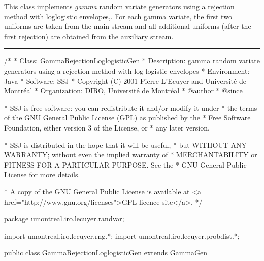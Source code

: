 
This class implements {\em gamma\/} random variate generators using
 a rejection method with loglogistic envelopes,.
For each gamma variate, the first two uniforms are taken from the 
main stream and all additional uniforms (after the first rejection)
are obtained from the auxiliary stream.

\bigskip\hrule

\begin{code}
\begin{hide}
/*
 * Class:        GammaRejectionLoglogisticGen
 * Description:  gamma random variate generators using a rejection method
                 with log-logistic envelopes
 * Environment:  Java
 * Software:     SSJ 
 * Copyright (C) 2001  Pierre L'Ecuyer and Université de Montréal
 * Organization: DIRO, Université de Montréal
 * @author       
 * @since

 * SSJ is free software: you can redistribute it and/or modify it under
 * the terms of the GNU General Public License (GPL) as published by the
 * Free Software Foundation, either version 3 of the License, or
 * any later version.

 * SSJ is distributed in the hope that it will be useful,
 * but WITHOUT ANY WARRANTY; without even the implied warranty of
 * MERCHANTABILITY or FITNESS FOR A PARTICULAR PURPOSE.  See the
 * GNU General Public License for more details.

 * A copy of the GNU General Public License is available at
   <a href="http://www.gnu.org/licenses">GPL licence site</a>.
 */
\end{hide}
package umontreal.iro.lecuyer.randvar;\begin{hide}
import umontreal.iro.lecuyer.rng.*;
import umontreal.iro.lecuyer.probdist.*;
\end{hide}

public class GammaRejectionLoglogisticGen extends GammaGen \begin{hide} {
    
   private RandomStream auxStream;

   // UNURAN parameters for the distribution
   private double beta;
   private double gamma;
   // Generator parameters
   // Rejection with log-logistic envelopes
   private double aa;
   private double bb;
   private double cc;
\end{hide}
\end{code}

